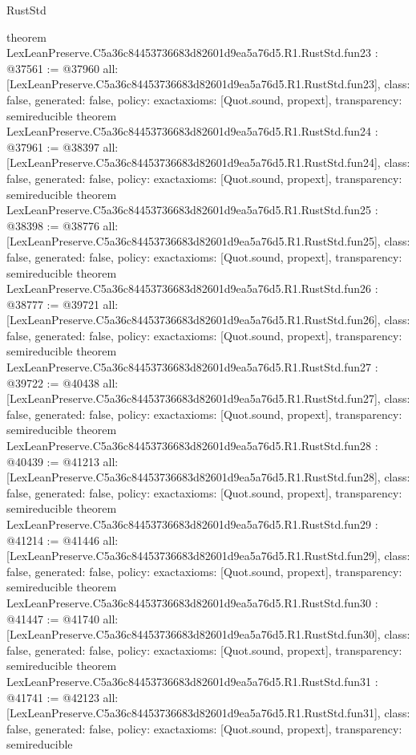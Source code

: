 \begin{lexlean}{RustStd}
\begin{coremodule}
{}
theorem LexLeanPreserve.C5a36c84453736683d82601d9ea5a76d5.R1.RustStd.fun23 : @37561 := @37960 {
  all: [LexLeanPreserve.C5a36c84453736683d82601d9ea5a76d5.R1.RustStd.fun23],
  class: false,
  generated: false,
  policy: exact{axioms: [Quot.sound, propext]},
  transparency: semireducible
}
theorem LexLeanPreserve.C5a36c84453736683d82601d9ea5a76d5.R1.RustStd.fun24 : @37961 := @38397 {
  all: [LexLeanPreserve.C5a36c84453736683d82601d9ea5a76d5.R1.RustStd.fun24],
  class: false,
  generated: false,
  policy: exact{axioms: [Quot.sound, propext]},
  transparency: semireducible
}
theorem LexLeanPreserve.C5a36c84453736683d82601d9ea5a76d5.R1.RustStd.fun25 : @38398 := @38776 {
  all: [LexLeanPreserve.C5a36c84453736683d82601d9ea5a76d5.R1.RustStd.fun25],
  class: false,
  generated: false,
  policy: exact{axioms: [Quot.sound, propext]},
  transparency: semireducible
}
theorem LexLeanPreserve.C5a36c84453736683d82601d9ea5a76d5.R1.RustStd.fun26 : @38777 := @39721 {
  all: [LexLeanPreserve.C5a36c84453736683d82601d9ea5a76d5.R1.RustStd.fun26],
  class: false,
  generated: false,
  policy: exact{axioms: [Quot.sound, propext]},
  transparency: semireducible
}
theorem LexLeanPreserve.C5a36c84453736683d82601d9ea5a76d5.R1.RustStd.fun27 : @39722 := @40438 {
  all: [LexLeanPreserve.C5a36c84453736683d82601d9ea5a76d5.R1.RustStd.fun27],
  class: false,
  generated: false,
  policy: exact{axioms: [Quot.sound, propext]},
  transparency: semireducible
}
theorem LexLeanPreserve.C5a36c84453736683d82601d9ea5a76d5.R1.RustStd.fun28 : @40439 := @41213 {
  all: [LexLeanPreserve.C5a36c84453736683d82601d9ea5a76d5.R1.RustStd.fun28],
  class: false,
  generated: false,
  policy: exact{axioms: [Quot.sound, propext]},
  transparency: semireducible
}
theorem LexLeanPreserve.C5a36c84453736683d82601d9ea5a76d5.R1.RustStd.fun29 : @41214 := @41446 {
  all: [LexLeanPreserve.C5a36c84453736683d82601d9ea5a76d5.R1.RustStd.fun29],
  class: false,
  generated: false,
  policy: exact{axioms: [Quot.sound, propext]},
  transparency: semireducible
}
theorem LexLeanPreserve.C5a36c84453736683d82601d9ea5a76d5.R1.RustStd.fun30 : @41447 := @41740 {
  all: [LexLeanPreserve.C5a36c84453736683d82601d9ea5a76d5.R1.RustStd.fun30],
  class: false,
  generated: false,
  policy: exact{axioms: [Quot.sound, propext]},
  transparency: semireducible
}
theorem LexLeanPreserve.C5a36c84453736683d82601d9ea5a76d5.R1.RustStd.fun31 : @41741 := @42123 {
  all: [LexLeanPreserve.C5a36c84453736683d82601d9ea5a76d5.R1.RustStd.fun31],
  class: false,
  generated: false,
  policy: exact{axioms: [Quot.sound, propext]},
  transparency: semireducible
}
\end{coremodule}
\end{lexlean}
